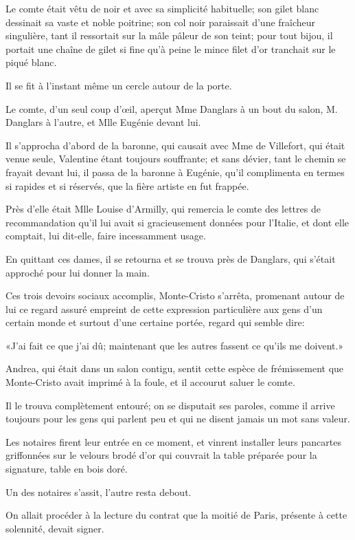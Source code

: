 Le comte était vêtu de noir et avec sa simplicité habituelle; son gilet blanc dessinait sa vaste et noble poitrine; son col noir paraissait d'une fraîcheur singulière, tant il ressortait sur la mâle pâleur de son teint; pour tout bijou, il portait une chaîne de gilet si fine qu'à peine le mince filet d'or tranchait sur le piqué blanc. 

Il se fit à l'instant même un cercle autour de la porte. 

Le comte, d'un seul coup d'œil, aperçut Mme Danglars à un bout du salon, M. Danglars à l'autre, et Mlle Eugénie devant lui. 

Il s'approcha d'abord de la baronne, qui causait avec Mme de Villefort, qui était venue seule, Valentine étant toujours souffrante; et sans dévier, tant le chemin se frayait devant lui, il passa de la baronne à Eugénie, qu'il complimenta en termes si rapides et si réservés, que la fière artiste en fut frappée. 

Près d'elle était Mlle Louise d'Armilly, qui remercia le comte des lettres de recommandation qu'il lui avait si gracieusement données pour l'Italie, et dont elle comptait, lui dit-elle, faire incessamment usage. 

En quittant ces dames, il se retourna et se trouva près de Danglars, qui s'était approché pour lui donner la main. 

Ces trois devoirs sociaux accomplis, Monte-Cristo s'arrêta, promenant autour de lui ce regard assuré empreint de cette expression particulière aux gens d'un certain monde et surtout d'une certaine portée, regard qui semble dire: 

«J'ai fait ce que j'ai dû; maintenant que les autres fassent ce qu'ils me doivent.» 

Andrea, qui était dans un salon contigu, sentit cette espèce de frémissement que Monte-Cristo avait imprimé à la foule, et il accourut saluer le comte. 

Il le trouva complètement entouré; on se disputait ses paroles, comme il arrive toujours pour les gens qui parlent peu et qui ne disent jamais un mot sans valeur. 

Les notaires firent leur entrée en ce moment, et vinrent installer leurs pancartes griffonnées sur le velours brodé d'or qui couvrait la table préparée pour la signature, table en bois doré. 

Un des notaires s'assit, l'autre resta debout. 

On allait procéder à la lecture du contrat que la moitié de Paris, présente à cette solennité, devait signer. 

